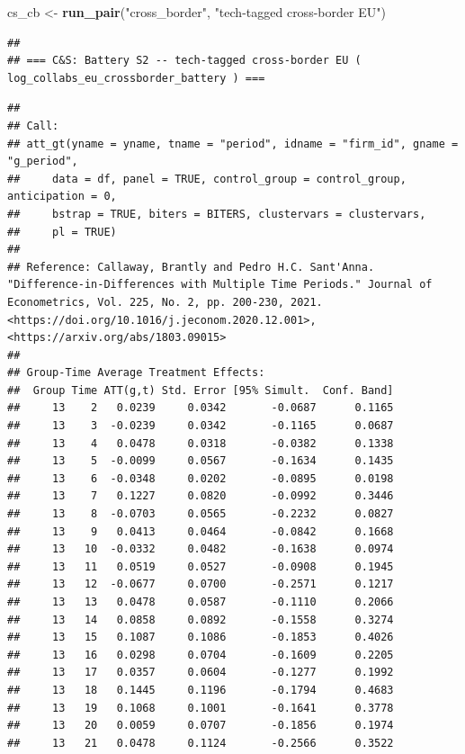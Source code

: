 \documentclass[
]{article}
\newenvironment{Shaded}{\begin{snugshade}}{\end{snugshade}}
\newcommand{\FunctionTok}[1]{\textcolor[rgb]{0.13,0.29,0.53}{\textbf{#1}}}
\newcommand{\NormalTok}[1]{#1}
\newcommand{\OtherTok}[1]{\textcolor[rgb]{0.56,0.35,0.01}{#1}}
\newcommand{\StringTok}[1]{\textcolor[rgb]{0.31,0.60,0.02}{#1}}
\begin{document}
\begin{Shaded}
\begin{Highlighting}[]
\NormalTok{cs\_cb   }\OtherTok{\textless{}{-}} \FunctionTok{run\_pair}\NormalTok{(}\StringTok{"cross\_border"}\NormalTok{, }\StringTok{"tech{-}tagged cross{-}border EU"}\NormalTok{)}
\end{Highlighting}
\end{Shaded}

\begin{verbatim}
## 
## === C&S: Battery S2 -- tech-tagged cross-border EU ( log_collabs_eu_crossborder_battery ) ===
\end{verbatim}

\begin{verbatim}
## 
## Call:
## att_gt(yname = yname, tname = "period", idname = "firm_id", gname = "g_period", 
##     data = df, panel = TRUE, control_group = control_group, anticipation = 0, 
##     bstrap = TRUE, biters = BITERS, clustervars = clustervars, 
##     pl = TRUE)
## 
## Reference: Callaway, Brantly and Pedro H.C. Sant'Anna.  "Difference-in-Differences with Multiple Time Periods." Journal of Econometrics, Vol. 225, No. 2, pp. 200-230, 2021. <https://doi.org/10.1016/j.jeconom.2020.12.001>, <https://arxiv.org/abs/1803.09015> 
## 
## Group-Time Average Treatment Effects:
##  Group Time ATT(g,t) Std. Error [95% Simult.  Conf. Band]  
##     13    2   0.0239     0.0342       -0.0687      0.1165  
##     13    3  -0.0239     0.0342       -0.1165      0.0687  
##     13    4   0.0478     0.0318       -0.0382      0.1338  
##     13    5  -0.0099     0.0567       -0.1634      0.1435  
##     13    6  -0.0348     0.0202       -0.0895      0.0198  
##     13    7   0.1227     0.0820       -0.0992      0.3446  
##     13    8  -0.0703     0.0565       -0.2232      0.0827  
##     13    9   0.0413     0.0464       -0.0842      0.1668  
##     13   10  -0.0332     0.0482       -0.1638      0.0974  
##     13   11   0.0519     0.0527       -0.0908      0.1945  
##     13   12  -0.0677     0.0700       -0.2571      0.1217  
##     13   13   0.0478     0.0587       -0.1110      0.2066  
##     13   14   0.0858     0.0892       -0.1558      0.3274  
##     13   15   0.1087     0.1086       -0.1853      0.4026  
##     13   16   0.0298     0.0704       -0.1609      0.2205  
##     13   17   0.0357     0.0604       -0.1277      0.1992  
##     13   18   0.1445     0.1196       -0.1794      0.4683  
##     13   19   0.1068     0.1001       -0.1641      0.3778  
##     13   20   0.0059     0.0707       -0.1856      0.1974  
##     13   21   0.0478     0.1124       -0.2566      0.3522  

\end{verbatim}
\end{document}
